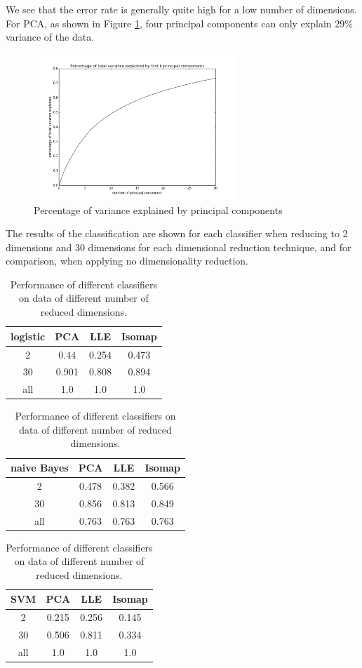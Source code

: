 \documentclass[11pt]{article}
\begin{document}
We see that the error rate is generally quite high for a low number of dimensions. For PCA, as shown in Figure \ref{pca-variance-explained}, four principal components can only explain 29\% variance of the data.

\begin{figure}[H]
\begin{center}
\includegraphics[width=3in]{pca_explained.png}
\end{center}
\caption{Percentage of variance explained by principal components}
\label{pca-variance-explained}
\end{figure}

The results of the classification are shown for each classifier when reducing to 2 dimensions and 30 dimensions for each dimensional reduction technique, and for comparison, when applying no dimensionality reduction.

\begin{table}[H]
\begin{center}
\begin{tabular}{|c|c|c|c|}\hline
logistic & PCA & LLE & Isomap\\\hline
2 & 0.44 & 0.254 & 0.473\\\hline
30 & 0.901 & 0.808 & 0.894\\\hline
all & 1.0 & 1.0 & 1.0\\\hline
\end{tabular}
\begin{tabular}{|c|c|c|c|}\hline
naive Bayes & PCA & LLE & Isomap\\\hline
2 & 0.478 & 0.382 & 0.566\\\hline
30 & 0.856 & 0.813 & 0.849\\\hline
all & 0.763 & 0.763 & 0.763\\\hline
\end{tabular}
\begin{tabular}{|c|c|c|c|}\hline
SVM & PCA & LLE & Isomap\\\hline
2 & 0.215 & 0.256 & 0.145\\\hline
30 & 0.506 & 0.811 & 0.334\\\hline
all & 1.0 & 1.0 & 1.0\\\hline
\end{tabular}
\end{center}
\caption{Performance of different classifiers on data of different number of reduced dimensions. }
\end{table}
\end{document}
